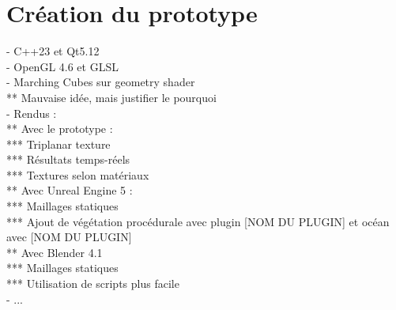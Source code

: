 \section{Création du prototype}
- C++23 et Qt5.12 \\
- OpenGL 4.6 et GLSL \\
- Marching Cubes sur geometry shader \\
** Mauvaise idée, mais justifier le pourquoi \\
- Rendus :\\
** Avec le prototype : \\
*** Triplanar texture \\
*** Résultats temps-réels \\
*** Textures selon matériaux \\
** Avec Unreal Engine 5 : \\
*** Maillages statiques \\
*** Ajout de végétation procédurale avec plugin [NOM DU PLUGIN] et océan avec [NOM DU PLUGIN] \\
** Avec Blender 4.1 \\
*** Maillages statiques \\
*** Utilisation de scripts plus facile \\
- ...